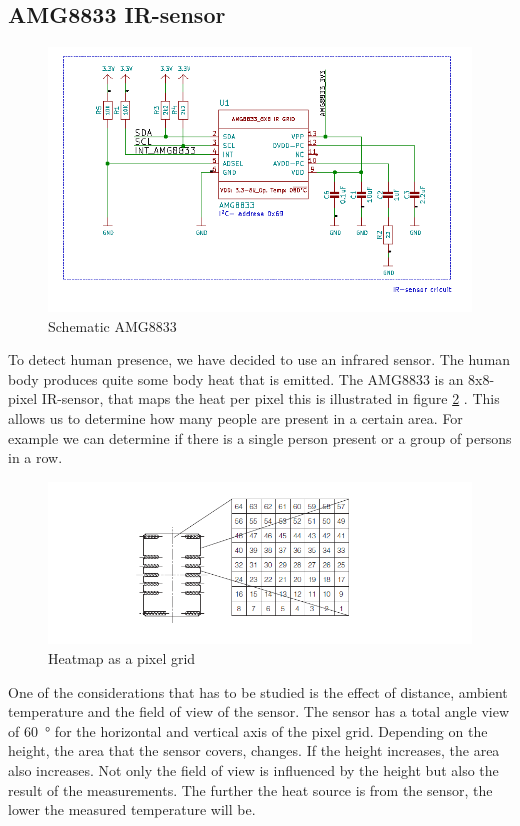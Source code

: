 \documentclass[11pt,a4paper]{article}
\begin{document}
\subsection{AMG8833 IR-sensor}
\begin{figure}[H]
	\centering
	\includegraphics[width=0.8\linewidth]{Schematic_AMG8833.png}
	\caption{Schematic AMG8833}
	\label{fig:AMG8833}
\end{figure}
To detect human presence, we have decided to use an infrared sensor. The human body produces quite some body heat that is emitted. The AMG8833 is an 8x8-pixel IR-sensor, that maps the heat per pixel this is illustrated in figure \ref{fig:heatmap} \cite{bib:AMG8833}. This allows us to determine how many people are present in a certain area. For example we can determine if there is a single person present or a group of persons in a row.
\begin{figure}[H]
	\centering
	\includegraphics[width=0.8\linewidth]{heat_map_AMG8833.png}
	\caption{Heatmap as a pixel grid \cite{bib:AMG8833}}
	\label{fig:heatmap}
\end{figure}
One of the considerations that has to be studied is the effect of distance, ambient temperature and the field of view of the sensor. The sensor has a total angle view of \SI{60}{\degree} \label{fig:angleview} \cite{bib:AMG8833} for the horizontal and vertical axis of the pixel grid. Depending on the height, the area that the sensor covers, changes. If the height increases, the area also increases. Not only the field of view is influenced by the height but also the result of the measurements. The further the heat source is from the sensor, the lower the measured temperature will be.
\end{document}
